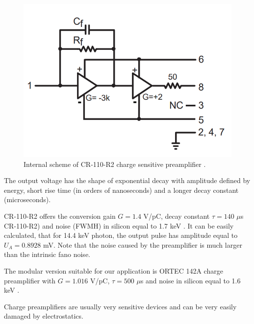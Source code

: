 \begin{figure}[H]
 \centering
 \includegraphics[scale=0.35, angle = 0]{./pictures/CRpreamp.png}
 \caption{Internal scheme of CR-110-R2 charge sensitive preamplifier \cite{cr110}.}
 \label{internal}
 
\end{figure}

The output voltage has the shape of exponential decay with amplitude defined by energy, short rise time (in orders of nanoseconds) and a longer decay constant (microseconds).


CR-110-R2 offers the conversion gain $G = 1.4$ V/pC, decay constant $\tau = 140$ $\mu$s CR-110-R2) and noise (FWMH) in silicon equal to 1.7 keV \cite{cr110}. It can be easily calculated, that for 14.4 keV photon, the output pulse has amplitude equal to $U_{A} = 0.8928$ mV. 
Note that the noise caused by the preamplifier is much larger than the intrinsic fano noise.


\par
The modular version suitable for our application is ORTEC 142A charge preamplifier with $G = 1.016$ V/pC, $\tau = 500$ $\mu$s and noise in silicon equal to 1.6 keV \cite{ORTECpreamp}.  






\par

Charge preamplifiers are usually very sensitive devices and can be very easily damaged by electrostatics. 




\par



